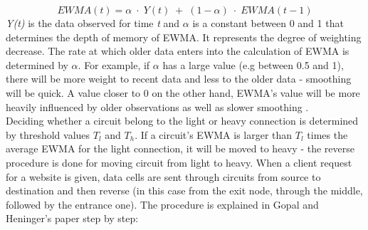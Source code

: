 \documentclass[a4paper, 12pt, titlepage]{article}
\begin{document}
\begin{equation*}
EWMA(t) = \alpha \; \cdotp \; Y (t) \; + \; (1 - \alpha) \; \cdotp \; EWMA(t - 1)
\end{equation*}
\textit{Y(t)} is the data observed for time \textit{t} and $\alpha$ is a constant between 0 and 1 that determines the depth of memory of EWMA. It represents the degree of weighting decrease. The rate at which older data enters into the calculation of EWMA is determined by $\alpha$. For example, if $\alpha$ has a large value (e.g between 0.5 and 1), there will be more weight to recent data and less to the older data - smoothing will be quick. A value closer to 0 on the other hand, EWMA's value will be more heavily influenced by older observations as well as slower smoothing \cite{EWMACC, SES}. \\[6pt]
Deciding whether a circuit belong to the light or heavy connection is determined by threshold values $T_l$ and $T_h$. If a circuit's EWMA is larger than $T_l$ times the average EWMA for the light connection, it will be moved to heavy - the reverse procedure is done for moving circuit from light to heavy. When a client request for a website is given, data cells are sent through circuits from source to destination and then reverse (in this case from the exit node, through the middle, followed by the entrance one). The procedure is explained in Gopal and Heninger's paper \cite{TorTrafficReduce} step by step:
\end{document}
